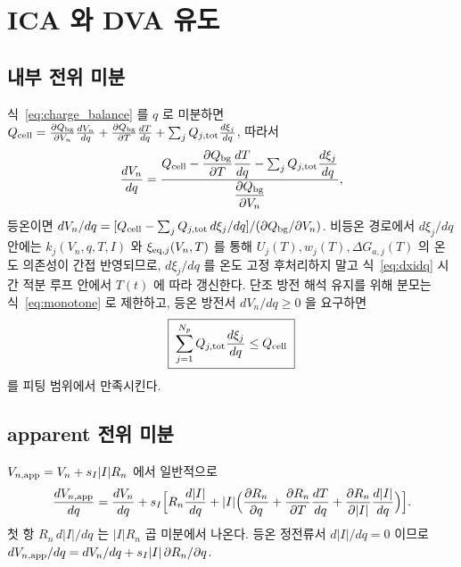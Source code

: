 \section{ICA 와 DVA 유도}\label{sec:ica}
\subsection{내부 전위 미분}
식~\eqref{eq:charge_balance} 를 $q$ 로 미분하면
$Q_{\mathrm{cell}}=\frac{\partial Q_{\mathrm{bg}}}{\partial V_n}\frac{dV_n}{dq}+\frac{\partial Q_{\mathrm{bg}}}{\partial T}\frac{dT}{dq}
+\sum_j Q_{j,\mathrm{tot}}\frac{d\xi_j}{dq}$, 따라서
\begin{equation}
\frac{dV_n}{dq}=\frac{Q_{\mathrm{cell}}-\dfrac{\partial Q_{\mathrm{bg}}}{\partial T}\dfrac{dT}{dq}-\sum_j Q_{j,\mathrm{tot}}\dfrac{d\xi_j}{dq}}
{\dfrac{\partial Q_{\mathrm{bg}}}{\partial V_n}},
\label{eq:dVdq_gen}
\end{equation}
등온이면 $dV_n/dq=[Q_{\mathrm{cell}}-\sum_j Q_{j,\mathrm{tot}}\,d\xi_j/dq]/(\partial Q_{\mathrm{bg}}/\partial V_n)$. 비등온 경로에서
$d\xi_j/dq$ 안에는 $k_j(V_n,q,T,I)$ 와 $\xi_{\mathrm{eq},j}(V_n,T)$ 를 통해 $U_j(T),w_j(T),\Delta G_{a,j}(T)$ 의
온도 의존성이 간접 반영되므로, $d\xi_j/dq$ 를 온도 고정 후처리하지 말고 식~\eqref{eq:dxidq} 시간 적분
루프 안에서 $T(t)$ 에 따라 갱신한다. 단조 방전 해석 유지를 위해 분모는 식~\eqref{eq:monotone} 로
제한하고, 등온 방전서 $dV_n/dq\ge0$ 을 요구하면
\begin{equation}
\boxed{\;\sum_{j=1}^{N_p}Q_{j,\mathrm{tot}}\frac{d\xi_j}{dq}\le Q_{\mathrm{cell}}\;}
\label{eq:monoconstraint}
\end{equation}
를 피팅 범위에서 만족시킨다.

\subsection{apparent 전위 미분}
$V_{n,\mathrm{app}}=V_n+s_I|I|R_n$ 에서 일반적으로
\begin{equation}
\frac{dV_{n,\mathrm{app}}}{dq}=\frac{dV_n}{dq}+s_I\Big[R_n\frac{d|I|}{dq}
+|I|\Big(\frac{\partial R_n}{\partial q}+\frac{\partial R_n}{\partial T}\frac{dT}{dq}+\frac{\partial R_n}{\partial|I|}\frac{d|I|}{dq}\Big)\Big].
\label{eq:dVappdq_gen}
\end{equation}
첫 항 $R_n\,d|I|/dq$ 는 $|I|R_n$ 곱 미분에서 나온다. 등온 정전류서 $d|I|/dq=0$ 이므로
$dV_{n,\mathrm{app}}/dq=dV_n/dq+s_I|I|\,\partial R_n/\partial q$.

